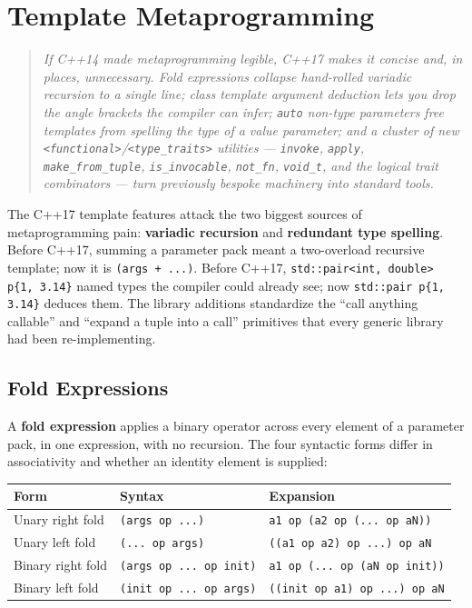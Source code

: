 \chapter{Template Metaprogramming}
\label{ch:c17-template-metaprogramming}

\begin{quote}
\emph{If C++14 made metaprogramming legible, C++17 makes it concise and, in places, unnecessary. Fold expressions collapse hand-rolled variadic recursion to a single line; class template argument deduction lets you drop the angle brackets the compiler can infer; \texttt{auto} non-type parameters free templates from spelling the type of a value parameter; and a cluster of new \texttt{<functional>}/\texttt{<type\_traits>} utilities --- \texttt{invoke}, \texttt{apply}, \texttt{make\_from\_tuple}, \texttt{is\_invocable}, \texttt{not\_fn}, \texttt{void\_t}, and the logical trait combinators --- turn previously bespoke machinery into standard tools.}
\end{quote}

The C++17 template features attack the two biggest sources of metaprogramming pain: \textbf{variadic recursion} and \textbf{redundant type spelling}. Before C++17, summing a parameter pack meant a two-overload recursive template; now it is \texttt{(args + ...)}. Before C++17, \texttt{std::pair<int, double> p\{1, 3.14\}} named types the compiler could already see; now \texttt{std::pair p\{1, 3.14\}} deduces them. The library additions standardize the ``call anything callable'' and ``expand a tuple into a call'' primitives that every generic library had been re-implementing.

\section{Fold Expressions}
\label{sec:c17-fold-expressions}

A \textbf{fold expression} applies a binary operator across every element of a parameter pack, in one expression, with no recursion. The four syntactic forms differ in associativity and whether an identity element is supplied:

\begin{center}
\begin{tabular}{lll}
\hline
\textbf{Form} & \textbf{Syntax} & \textbf{Expansion} \\
\hline
Unary right fold  & \texttt{(args op ...)}          & \texttt{a1 op (a2 op (... op aN))} \\
Unary left fold   & \texttt{(... op args)}          & \texttt{((a1 op a2) op ...) op aN} \\
Binary right fold & \texttt{(args op ... op init)}  & \texttt{a1 op (... op (aN op init))} \\
Binary left fold  & \texttt{(init op ... op args)}  & \texttt{((init op a1) op ...) op aN} \\
\hline
\end{tabular}
\end{center}

